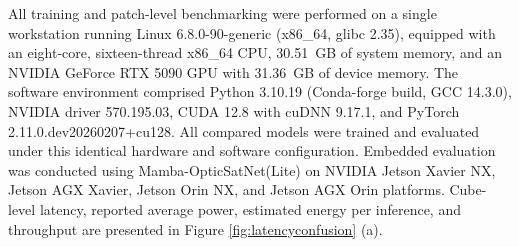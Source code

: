 \documentclass[a4paper,fleqn]{cas-dc}
\begin{document}
All training and patch-level benchmarking were performed on a single workstation running Linux 6.8.0-90-generic (x86\_64, glibc 2.35), equipped with an eight-core, sixteen-thread x86\_64 CPU, 30.51~GB of system memory, and an NVIDIA GeForce RTX 5090 GPU with 31.36~GB of device memory. The software environment comprised Python 3.10.19 (Conda-forge build, GCC 14.3.0), NVIDIA driver 570.195.03, CUDA 12.8 with cuDNN 9.17.1, and PyTorch 2.11.0.dev20260207+cu128. All compared models were trained and evaluated under this identical hardware and software configuration.
Embedded evaluation was conducted using Mamba-OpticSatNet(Lite) on NVIDIA Jetson Xavier NX, Jetson AGX Xavier, Jetson Orin NX, and Jetson AGX Orin platforms. Cube-level latency, reported average power, estimated energy per inference, and throughput are presented in Figure \ref{fig:latencyconfusion} (a).
\end{document}
